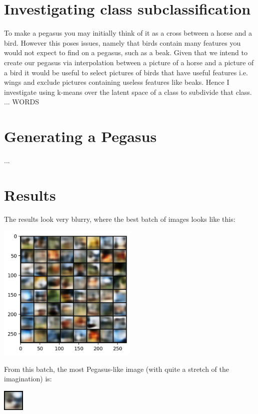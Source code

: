 \documentclass{article}
\begin{document}
\section{Investigating class subclassification}
To make a pegasus you may initially think of it as a cross between a horse and a bird. However this poses issues, namely that birds contain many features you would not expect to find on a pegasus, such as a beak. Given that we intend to create our pegasus via interpolation between a picture of a horse and a picture of a bird it would be useful to select pictures of birds that have useful features i.e. wings and exclude pictures containing useless features like beaks. Hence I investigate using k-means over the latent space of a class to subdivide that class.
...    WORDS

\section{Generating a Pegasus}
...

\section{Results}
The results look very blurry, where the best batch of images looks like this:
\begin{center}
    \includegraphics[width=0.5\textwidth]{figures/best-batch.png}
\end{center}
From this batch, the most Pegasus-like image (with quite a stretch of the imagination) is:
\begin{center}
    \includegraphics[width=0.075\textwidth]{figures/best-pegasus.png}
\end{center}
\end{document}
